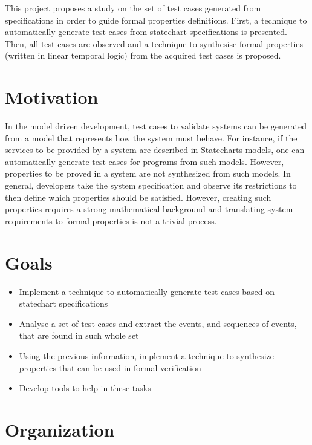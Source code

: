 This project proposes a study on the set of test cases generated from specifications in order to guide formal properties definitions. First, a technique to automatically generate test cases from statechart specifications is presented. Then, all test cases are observed and a technique to synthesise formal properties (written in linear temporal logic\cite{Hauth,wikiLTL}) from the acquired test cases is proposed. 

\section{Motivation}

In the model driven development, test cases to validate systems can be generated from a model that represents how the system must behave. For instance, if the services to be provided by a system are described in Statecharts models, one can  automatically generate test cases for programs from such models. However, properties to be proved in a system are not synthesized from such models. In general, developers take the system specification and observe its restrictions to then define which properties should be satisfied. However, creating such properties requires a strong mathematical background and translating system requirements to formal properties is not a trivial process\cite{Prospec}.

\section{Goals}

\begin{itemize}

\item Implement a technique to automatically generate test cases based on statechart specifications

\item Analyse a set of test cases and extract the events, and sequences of events, that are found in such whole set

\item Using the previous information, implement a technique to synthesize properties that can be used in formal verification 

\item Develop tools to help in these tasks

\end{itemize}

\section{Organization}


